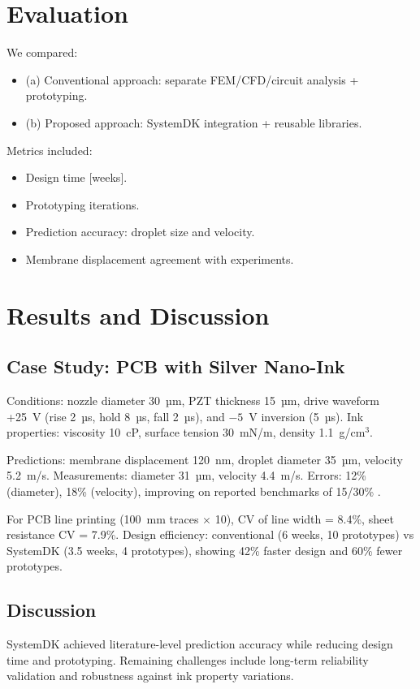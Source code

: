 \documentclass[conference]{IEEEtran}
\begin{document}
\section{Evaluation}
We compared:
\begin{itemize}
  \item (a) Conventional approach: separate FEM/CFD/circuit analysis + prototyping.
  \item (b) Proposed approach: SystemDK integration + reusable libraries.
\end{itemize}

Metrics included:
\begin{itemize}
  \item Design time [weeks].
  \item Prototyping iterations.
  \item Prediction accuracy: droplet size and velocity.
  \item Membrane displacement agreement with experiments.
\end{itemize}

\section{Results and Discussion}
\subsection{Case Study: PCB with Silver Nano-Ink}
Conditions: nozzle diameter 30~µm, PZT thickness 15~µm, drive waveform +25~V (rise 2~µs, hold 8~µs, fall 2~µs), and $-5$~V inversion (5~µs). 
Ink properties: viscosity 10~cP, surface tension 30~mN/m, density 1.1~g/cm$^3$.

Predictions: membrane displacement 120~nm, droplet diameter 35~µm, velocity 5.2~m/s.  
Measurements: diameter 31~µm, velocity 4.4~m/s.  
Errors: 12\% (diameter), 18\% (velocity), improving on reported benchmarks of 15/30\% \cite{boccio2003,lei2012}.

For PCB line printing (100~mm traces $\times$ 10), CV of line width = 8.4\%, sheet resistance CV = 7.9\%.  
Design efficiency: conventional (6 weeks, 10 prototypes) vs SystemDK (3.5 weeks, 4 prototypes), showing 42\% faster design and 60\% fewer prototypes.

\subsection{Discussion}
SystemDK achieved literature-level prediction accuracy while reducing design time and prototyping. 
Remaining challenges include long-term reliability validation and robustness against ink property variations.
\end{document}
